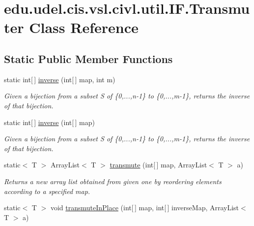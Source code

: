\hypertarget{classedu_1_1udel_1_1cis_1_1vsl_1_1civl_1_1util_1_1IF_1_1Transmuter}{}\section{edu.\+udel.\+cis.\+vsl.\+civl.\+util.\+I\+F.\+Transmuter Class Reference}
\label{classedu_1_1udel_1_1cis_1_1vsl_1_1civl_1_1util_1_1IF_1_1Transmuter}
\subsection*{Static Public Member Functions}
\begin{DoxyCompactItemize}
\item 
static int\mbox{[}$\,$\mbox{]} \hyperlink{classedu_1_1udel_1_1cis_1_1vsl_1_1civl_1_1util_1_1IF_1_1Transmuter_a84f4f05cb4a9e2cbe0a4bdbabb3d79c5}{inverse} (int\mbox{[}$\,$\mbox{]} map, int m)
\begin{DoxyCompactList}\small\item\em Given a bijection from a subset S of \{0,...,n-\/1\} to \{0,...,m-\/1\}, returns the inverse of that bijection. \end{DoxyCompactList}\item 
static int\mbox{[}$\,$\mbox{]} \hyperlink{classedu_1_1udel_1_1cis_1_1vsl_1_1civl_1_1util_1_1IF_1_1Transmuter_a3578ec8f4a52a21876b96224b3cc1994}{inverse} (int\mbox{[}$\,$\mbox{]} map)
\begin{DoxyCompactList}\small\item\em Given a bijection from a subset S of \{0,...,n-\/1\} to \{0,...,m-\/1\}, returns the inverse of that bijection. \end{DoxyCompactList}\item 
static$<$ T $>$ Array\+List$<$ T $>$ \hyperlink{classedu_1_1udel_1_1cis_1_1vsl_1_1civl_1_1util_1_1IF_1_1Transmuter_adb319a1d57b76ae1bcb2a618a5851b36}{transmute} (int\mbox{[}$\,$\mbox{]} map, Array\+List$<$ T $>$ a)
\begin{DoxyCompactList}\small\item\em Returns a new array list obtained from given one by reordering elements according to a specified map. \end{DoxyCompactList}\item 
static$<$ T $>$ void \hyperlink{classedu_1_1udel_1_1cis_1_1vsl_1_1civl_1_1util_1_1IF_1_1Transmuter_ab72f5bd48bc75d63d3ea508870e50ce3}{transmute\+In\+Place} (int\mbox{[}$\,$\mbox{]} map, int\mbox{[}$\,$\mbox{]} inverse\+Map, Array\+List$<$ T $>$ a)

\end{DoxyCompactItemize}
